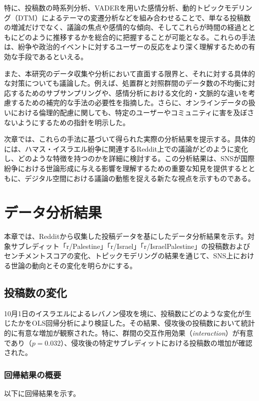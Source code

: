 \documentclass[11pt, a4j]{jreport}
\begin{document}
    特に、投稿数の時系列分析、VADERを用いた感情分析、動的トピックモデリング（DTM）によるテーマの変遷分析などを組み合わせることで、単なる投稿数の増減だけでなく、議論の焦点や感情的な傾向、そしてこれらが時間の経過とともにどのように推移するかを総合的に把握することが可能となる。これらの手法は、紛争や政治的イベントに対するユーザーの反応をより深く理解するための有効な手段であるといえる。

    また、本研究のデータ収集や分析において直面する限界と、それに対する具体的な対策についても議論した。例えば、処置群と対照群間のデータ数の不均衡に対応するためのサブサンプリングや、感情分析における文化的・文脈的な違いを考慮するための補完的な手法の必要性を指摘した。さらに、オンラインデータの扱いにおける倫理的配慮に関しても、特定のユーザーやコミュニティに害を及ぼさないようにするための指針を明示した。

    次章では、これらの手法に基づいて得られた実際の分析結果を提示する。具体的には、ハマス・イスラエル紛争に関連するReddit上での議論がどのように変化し、どのような特徴を持つのかを詳細に検討する。この分析結果は、SNSが国際紛争における世論形成に与える影響を理解するための重要な知見を提供するとともに、デジタル空間における議論の動態を捉える新たな視点を示すものである。

    \chapter{データ分析結果}
    本章では、Redditから収集した投稿データを基にしたデータ分析結果を示す。対象サブレディット「r/Palestine」「r/Israel」「r/IsraelPalestine」の投稿数およびセンチメントスコアの変化、トピックモデリングの結果を通じて、SNS上における世論の動向とその変化を明らかにする。

    \section{投稿数の変化}
    10月1日のイスラエルによるレバノン侵攻を境に、投稿数にどのような変化が生じたかをOLS回帰分析により検証した。その結果、侵攻後の投稿数において統計的に有意な増加が観察された。特に、群間の交互作用効果（\textit{interaction}）が有意であり（$p = 0.032$）、侵攻後の特定サブレディットにおける投稿数の増加が確認された。

    \subsection*{回帰結果の概要}
    以下に回帰結果を示す。
\end{document}
